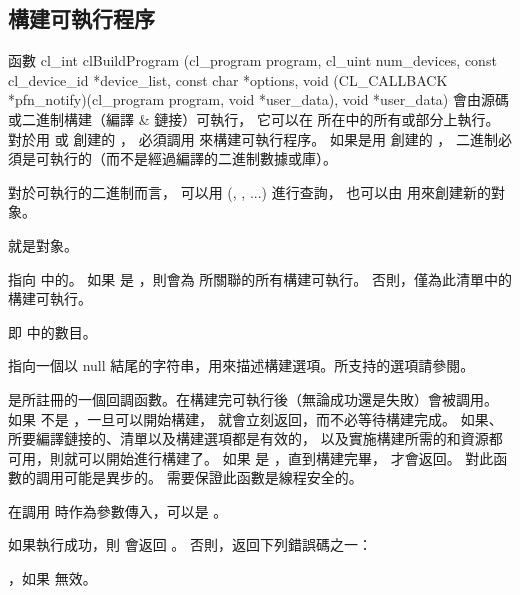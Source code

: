 \subsection{構建可執行程序}

函數
\startclc
cl_int clBuildProgram (cl_program program,
			cl_uint num_devices,
			const cl_device_id *device_list,
			const char *options,
			void (CL_CALLBACK *pfn_notify)(cl_program program,
						void *user_data),
			void *user_data)
\stopclc
會由源碼或二進制構建（編譯 & 鏈接）可執行，
它可以在  所在中的所有或部分上執行。
對於用  或  創建的 ，
必須調用  來構建可執行程序。
如果是用  創建的 ，
二進制必須是可執行的（而不是經過編譯的二進制數據或庫）。

對於可執行的二進制而言，
可以用 (, , ...) 進行查詢，
也可以由  用來創建新的對象。

 就是對象。

 指向  中的。
如果  是 ，則會為  所關聯的所有構建可執行。
否則，僅為此清單中的構建可執行。

 即  中的數目。

 指向一個以 null 結尾的字符串，用來描述構建選項。所支持的選項請參閱。

 是所註冊的一個回調函數。在構建完可執行後（無論成功還是失敗）會被調用。
如果  不是 ，一旦可以開始構建，  就會立刻返回，而不必等待構建完成。
如果、所要編譯鏈接的、清單以及構建選項都是有效的，
以及實施構建所需的和資源都可用，則就可以開始進行構建了。
如果  是 ，直到構建完畢，  才會返回。
對此函數的調用可能是異步的。
需要保證此函數是線程安全的。

 在調用  時作為參數傳入，可以是 。

如果執行成功，則  會返回 。
否則，返回下列錯誤碼之一：
\startigBase
\item {}，如果  無效。

